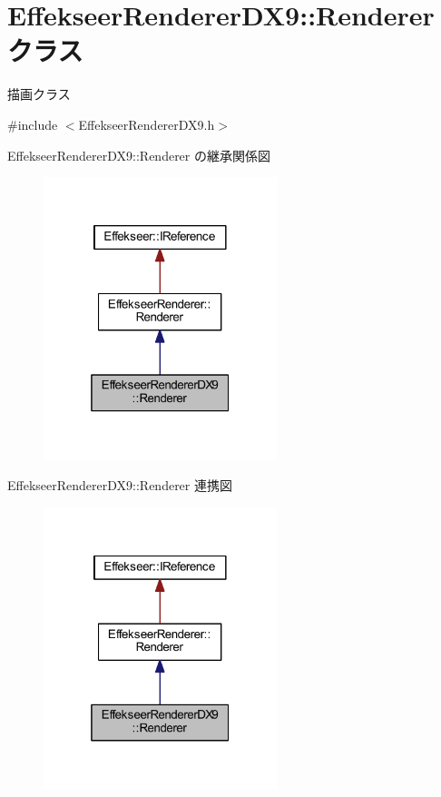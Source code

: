 \hypertarget{class_effekseer_renderer_d_x9_1_1_renderer}{}\section{Effekseer\+Renderer\+D\+X9\+:\+:Renderer クラス}
\label{class_effekseer_renderer_d_x9_1_1_renderer}


描画クラス  




{\ttfamily \#include $<$Effekseer\+Renderer\+D\+X9.\+h$>$}



Effekseer\+Renderer\+D\+X9\+:\+:Renderer の継承関係図\nopagebreak
\begin{figure}[H]
\begin{center}
\leavevmode
\includegraphics[width=193pt]{class_effekseer_renderer_d_x9_1_1_renderer__inherit__graph}
\end{center}
\end{figure}


Effekseer\+Renderer\+D\+X9\+:\+:Renderer 連携図\nopagebreak
\begin{figure}[H]
\begin{center}
\leavevmode
\includegraphics[width=193pt]{class_effekseer_renderer_d_x9_1_1_renderer__coll__graph}
\end{center}
\end{figure}
